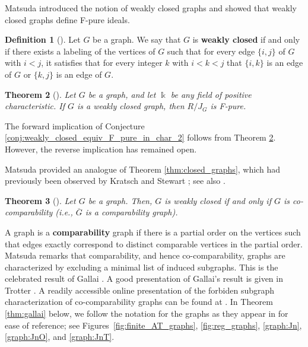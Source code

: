 \documentclass[12pt,a4paper]{amsart}
\theoremstyle{plain}
\newtheorem{thrm}{Theorem}[section]
\def\bthm{\begin{thrm}}
\def\ethm{\end{thrm}}
\theoremstyle{definition}
\newtheorem{defn}[thrm]{Definition}
\def\bdefn{\begin{defn}}
\def\edefn{\end{defn}}
\theoremstyle{remark}
\def\k{\Bbbk}
\newcommand{\ol}[1]{\overline{#1}}
\begin{document}
Matsuda introduced the notion of weakly closed graphs and showed that weakly closed graphs define F-pure ideals.

\bdefn[\cite{matsuda2018weakly}]
\label{defn:weakly_closed}
Let $G$ be a graph. We say that $G$ is \textbf{weakly closed} if and only if there exists a labeling of the vertices of $G$ such that for every edge $\{i,j\}$ of $G$ with $i < j$, it satisfies that for every integer $k$ with $i < k < j$ that $\{i,k\}$ is an edge of $G$ or $\{k,j\}$ is an edge of $G$.
\edefn 

\bthm[{\cite[Theorem 2.3]{matsuda2018weakly}}]
\label{thm:weakly_closed_are_F_pure}
Let $G$ be a graph, and let $\k$ be any field of positive characteristic. If $G$ is a weakly closed graph, then $R/J_{G}$ is F-pure.
\ethm




The forward implication of Conjecture \ref{conj:weakly_closed_equiv_F_pure_in_char_2} follows from Theorem \ref{thm:weakly_closed_are_F_pure}. However, the reverse implication has remained open.


Matsuda provided an analogue of Theorem \ref{thm:closed_graphs}, which had previously been observed by Kratsch and Stewart \cite[p. 402]{KS93}; see also \cite[Proposition 5.1]{COS93}.


\bthm[{\cite[Theorem 1.9]{matsuda2018weakly}}]
\label{thm:weakly_closed_equivalent_co_comparable}
Let $G$ be a graph. Then, $G$ is weakly closed if and only if $G$ is co-comparability (i.e., $\ol{G}$ is a comparability graph). 
\ethm

\noindent A graph is a \textbf{comparability} graph if there is a partial order on the vertices such that edges exactly correspond to distinct comparable vertices in the partial order. 
 Matsuda remarks that comparability, and hence co-comparability, graphs are characterized by excluding a minimal list of induced subgraphs. This is the celebrated result of Gallai \cite{gallai1967transitiv}. A good presentation of Gallai's result is given in Trotter \cite{trotter1992combinatorics}. A readily accessible online presentation of the forbiden subgraph characterization of co-comparability graphs can be found at \cite{isgci}. In Theorem \ref{thm:gallai} below, we follow the notation for the graphs as they appear in \cite{isgci} for ease of reference; see Figures~\ref{fig:finite_AT_graphs},  \ref{fig:reg_graphs}, \ref{graph:Jn}, \ref{graph:JnO}, and \ref{graph:JnT}.
\end{document}

